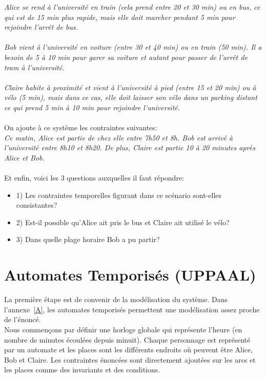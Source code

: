 \documentclass[11pt, a4paper]{article} %
\begin{document}
\textit{Alice se rend à l'université en train (cela prend entre 20 et 30 min) ou en bus, ce qui est de 15 min plus rapide, mais elle doit marcher pendant 5 min pour rejoindre l'arrêt de bus.\\
\\
Bob vient à l'université en voiture (entre 30 et 40 min) ou en train (50 min). Il a besoin de 5 à 10 min pour garer sa voiture et autant pour passer de l'arrêt de tram à l'université.\\
\\
Claire habite à proximité et vient à l'université à pied (entre 15 et 20 min) ou à vélo (5 min), mais dans ce cas, elle doit laisser son vélo dans un parking distant ce qui prend 5 min à 10 min pour rejoindre l'université.\\}
\\
On ajoute à ce système les contraintes suivantes:\\
\textit{Ce matin, Alice est partie de chez elle entre 7h50 et 8h. Bob est arrivé à l'université entre 8h10 et 8h20. De plus, Claire est partie 10 à 20 minutes après Alice et Bob.\\}
\\
Et enfin, voici les 3 questions auxquelles il faut répondre:
\begin{itemize}
    \item 1) Les contraintes temporelles figurant dans ce scénario sont-elles consistantes?
    \item 2) Est-il possible qu'Alice ait pris le bus et Claire ait utilisé le vélo?
    \item 3) Dans quelle plage horaire Bob a pu partir?
\end{itemize}

\clearpage

\section{Automates Temporisés (UPPAAL)}
\label{sec:UPPAAL}
La première étape est de convenir de la modélisation du système. Dans l'annexe~\ref{A}, les automates temporisés permettent une modélisation assez proche de l'énoncé. \\
Nous commençons par définir une horloge globale qui représente l'heure (en nombre de minutes écoulées depuis minuit). Chaque personnage est représenté par un automate et les places sont les différents endroits où peuvent être Alice, Bob et Claire. Les contraintes énoncées sont directement ajoutées sur les arcs et les places comme des invariants et des conditions. 
\end{document}
